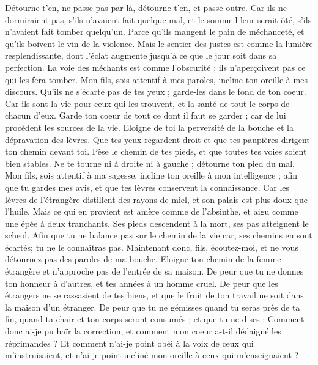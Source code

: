 \begin{multicols}{2}
Détourne-t'en, ne passe pas par là, détourne-t'en, et passe outre.
Car ils ne dormiraient pas, s'ils n'avaient fait quelque mal, et le sommeil leur serait ôté, s'ils n'avaient fait tomber quelqu'un.
Parce qu'ils mangent le pain de méchanceté, et qu'ils boivent le vin de la violence.
Mais le sentier des justes est comme la lumière resplendissante, dont l'éclat augmente jusqu'à ce que le jour soit dans sa perfection.
La voie des méchants est comme l'obscurité ; ils n'aperçoivent pas ce qui les fera tomber.
Mon fils, sois attentif à mes paroles, incline ton oreille à mes discours.
Qu'ils ne s'écarte pas de tes yeux ; garde-les dans le fond de ton coeur.
Car ils sont la vie pour ceux qui les trouvent, et la santé de tout le corps de chacun d'eux.
Garde ton coeur de tout ce dont il faut se garder ; car de lui procèdent les sources de la vie.
Eloigne de toi la perversité de la bouche et la dépravation des lèvres.
Que tes yeux regardent droit et que tes paupières dirigent ton chemin devant toi.
Pèse le chemin de tes pieds, et que toutes tes voies soient bien stables.
Ne te tourne ni à droite ni à gauche ; détourne ton pied du mal.
\VerseOne{}Mon fils, sois attentif à ma sagesse, incline ton oreille à mon intelligence ;
afin que tu gardes mes avis, et que tes lèvres conservent la connaissance.
Car les lèvres de l'étrangère distillent des rayons de miel, et son palais est plus doux que l'huile.
Mais ce qui en provient est amère comme de l'absinthe, et aigu comme une épée à deux tranchants.
Ses pieds descendent à la mort, ses pas atteignent le scheol.
Afin que tu ne balance pas sur le chemin de la vie car, ses chemins en sont écartés; tu ne le connaîtras pas.
Maintenant donc, fils, écoutez-moi, et ne vous détournez pas des paroles de ma bouche.
Eloigne ton chemin de la femme étrangère et n'approche pas de l'entrée de sa maison.
De peur que tu ne donnes ton honneur à d'autres, et tes années à un homme cruel.
De peur que les étrangers ne se rassasient de tes biens, et que le fruit de ton travail ne soit dans la maison d'un étranger.
De peur que tu ne gémisses quand tu seras près de ta fin, quand ta chair et ton corps seront consumés ;
et que tu ne dises : Comment donc ai-je pu haïr la correction, et comment mon coeur a-t-il dédaigné les réprimandes ?
Et comment n'ai-je point obéi à la voix de ceux qui m'instruisaient, et n'ai-je point incliné mon oreille à ceux qui m'enseignaient ?

\end{multicols}
